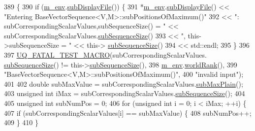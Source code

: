 \begin{DoxyCode}
389 \{
390   \textcolor{keywordflow}{if} (\hyperlink{class_q_u_e_s_o_1_1_base_vector_sequence_a8e8824d2a63c5a43bcc6473e3a0491e8}{m\_env}.\hyperlink{class_q_u_e_s_o_1_1_base_environment_a8a0064746ae8dddfece4229b9ad374d6}{subDisplayFile}()) \{
391     *\hyperlink{class_q_u_e_s_o_1_1_base_vector_sequence_a8e8824d2a63c5a43bcc6473e3a0491e8}{m\_env}.\hyperlink{class_q_u_e_s_o_1_1_base_environment_a8a0064746ae8dddfece4229b9ad374d6}{subDisplayFile}() << \textcolor{stringliteral}{"Entering
       BaseVectorSequence<V,M>::subPositionsOfMaximum()"}
392                             << \textcolor{stringliteral}{": subCorrespondingScalarValues,subSequenceSize() = "} << 
      subCorrespondingScalarValues.\hyperlink{class_q_u_e_s_o_1_1_scalar_sequence_a0288ea295eedc216a1617b3286f6f3a0}{subSequenceSize}()
393                             << \textcolor{stringliteral}{", this->subSequenceSize = "} << this->
      \hyperlink{class_q_u_e_s_o_1_1_base_vector_sequence_afd6278702d40bdf1044697bbd6ad1957}{subSequenceSize}()
394                             << std::endl;
395   \}
396 
397   \hyperlink{_defines_8h_a56d63d18d0a6d45757de47fcc06f574d}{UQ\_FATAL\_TEST\_MACRO}(subCorrespondingScalarValues.
      \hyperlink{class_q_u_e_s_o_1_1_scalar_sequence_a0288ea295eedc216a1617b3286f6f3a0}{subSequenceSize}() != this->\hyperlink{class_q_u_e_s_o_1_1_base_vector_sequence_afd6278702d40bdf1044697bbd6ad1957}{subSequenceSize}(),
398                       \hyperlink{class_q_u_e_s_o_1_1_base_vector_sequence_a8e8824d2a63c5a43bcc6473e3a0491e8}{m\_env}.\hyperlink{class_q_u_e_s_o_1_1_base_environment_a78b57112bbd0e6dd0e8afec00b40ffa7}{worldRank}(),
399                       \textcolor{stringliteral}{"BaseVectorSequence<V,M>::subPositionsOfMaximum()"},
400                       \textcolor{stringliteral}{"invalid input"});
401 
402   \textcolor{keywordtype}{double} subMaxValue = subCorrespondingScalarValues.\hyperlink{class_q_u_e_s_o_1_1_scalar_sequence_ae4689059a4d99dffd386422f1c1aa4b9}{subMaxPlain}();
403   \textcolor{keywordtype}{unsigned} \textcolor{keywordtype}{int} iMax = subCorrespondingScalarValues.\hyperlink{class_q_u_e_s_o_1_1_scalar_sequence_a0288ea295eedc216a1617b3286f6f3a0}{subSequenceSize}();
404 
405   \textcolor{keywordtype}{unsigned} \textcolor{keywordtype}{int} subNumPos = 0;
406   \textcolor{keywordflow}{for} (\textcolor{keywordtype}{unsigned} \textcolor{keywordtype}{int} i = 0; i < iMax; ++i) \{
407     \textcolor{keywordflow}{if} (subCorrespondingScalarValues[i] == subMaxValue) \{
408       subNumPos++;
409     \}
410   \}

\end{DoxyCode}

